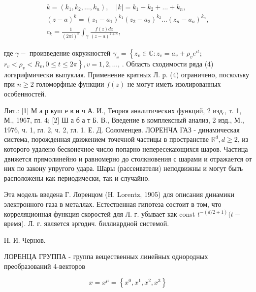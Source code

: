 \documentclass[10pt]{article}
\begin{document}
\[

\begin{gathered}

k=\left(k_{1}, k_{2}, \ldots, k_{n}\right), \quad|k|=k_{1}+k_{2}+\ldots+k_{n}, \\

(z-a)^{k}=\left(z_{1}-a_{1}\right)^{k_{1}}\left(z_{2}-a_{2}\right)^{k_{2}} \ldots\left(z_{n}-a_{n}\right)^{k_{n}}, \\

c_{k}=\frac{1}{(2 \pi i)^{n}} \int_{\gamma} \frac{f(z) d z}{(z-a)^{k+n}},

\end{gathered}

\]



где $\gamma-$ произведение окружностей $\gamma_{v}=\left\{z_{v} \in \mathbb{C}: z_{v}=a_{v}+\rho_{v} e^{i t}\right.$; $\left.r_{v}<\rho_{v}<R_{v}, 0 \leqslant t \leqslant 2 \pi\right\}, v=1,2, \ldots$, . Область сходимости ряда (4) логарифмически выпуклая. Применение кратных Л. р. (4) ограничено, поскольку при $n \geqslant 2$ голоморфные функции $f(z)$ не могут иметь изолированных особенностей.



Лит.: [1] М а р куш е в и ч А. И., Теория аналитических функций, 2 изд., т. 1, М., 1967, гл. 4; [2] Ш а б а т Б. В., Введение в комплексный анализ, 2 изд., М., 1976, ч. 1, гл. 2, ч. 2, гл. 1. Е. Д. Соломенцев. ЛОРЕНЧА ГАЗ - динамическая система, порожденная движением точечной частицы в пространстве $\mathbb{R}^{d}, d \geqslant 2$, из которого удалено бесконечное число попарно непересекающихся шаров. Частица движется прямолинейно и равномерно до столкновения с шарами и отражается от них по закону упругого удара. Шары (рассеиватели) неподвижны и могут быть расположены как периодически, так и случайно.



Эта модель введена Г. Лоренцом (H. Lorentz, 1905) для описания динамики электронного газа в металлах. Естественная гипотеза состоит в том, что корреляционная функция скоростей для Л. г. убывает как const $t^{-(d / 2+1)}(t-$ время). Л. г. является эргодич. биллиардной системой.



Н. И. Чернов.



ЛОРЕНЦА ГРУППА - группа вещественных линейных однородных преобразований 4-векторов



\[

x=x^{\mu}=\left\{x^{0}, x^{1}, x^{2}, x^{3}\right\}

\]
\end{document}
